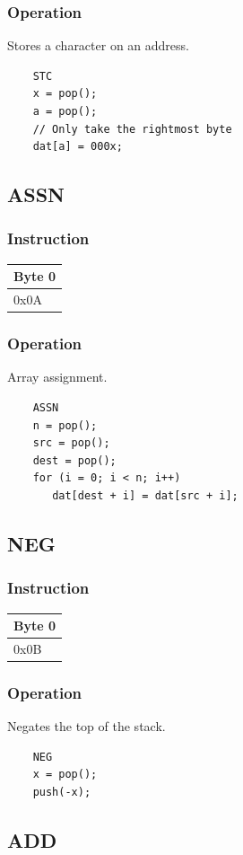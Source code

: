 \documentclass[11pt]{report}
\newcommand{\onebyteinstruction}[1]{
\begin{tabular}{|p{3.9em}|}
\hline
\tiny{Byte 0} \\ \hline
#1  \\ \hline
\end{tabular}
}
\begin{document}
\subsubsection{Operation}
Stores a character on an address.

	\begin{lstlisting}
	STC
	x = pop();
	a = pop();
	// Only take the rightmost byte
	dat[a] = 000x;
	\end{lstlisting}

\subsection{ASSN}
\subsubsection{Instruction}
\onebyteinstruction{0x0A}

\subsubsection{Operation}
Array assignment.

	\begin{lstlisting}
	ASSN
	n = pop();
	src = pop();
	dest = pop();
	for (i = 0; i < n; i++)
	   dat[dest + i] = dat[src + i];
	\end{lstlisting}

\subsection{NEG}
\subsubsection{Instruction}
\onebyteinstruction{0x0B}

\subsubsection{Operation}
Negates the top of the stack.

	\begin{lstlisting}
	NEG
	x = pop();
	push(-x);
	\end{lstlisting}

\subsection{ADD}
\end{document}
